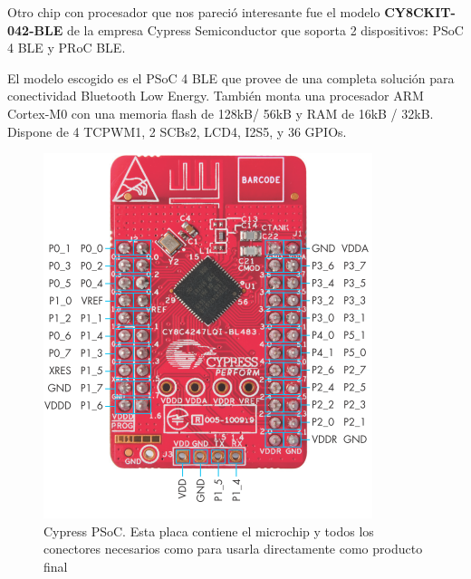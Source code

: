 Otro chip con procesador que nos pareció interesante fue el modelo \textbf{CY8CKIT-042-BLE} de la empresa Cypress Semiconductor que soporta 2 dispositivos: PSoC 4 BLE y PRoC BLE.

El modelo escogido es el PSoC 4 BLE que provee de una completa solución para conectividad Bluetooth Low Energy. También monta una procesador ARM Cortex-M0 con una memoria flash de 128kB/ 56kB y RAM de 16kB / 32kB. Dispone de 4 TCPWM1, 2 SCBs2, LCD4, I2S5, y 36 GPIOs.

\begin{figure}[h]%
	\centering
    \includegraphics[scale=0.6]{figures/cypress_psoc.PNG} %

    \caption[Cypress PSoC]{Cypress PSoC. Esta placa contiene el microchip y todos los conectores necesarios como para usarla directamente como producto final}

   \label{figuraCypressPeque}
\end{figure}


